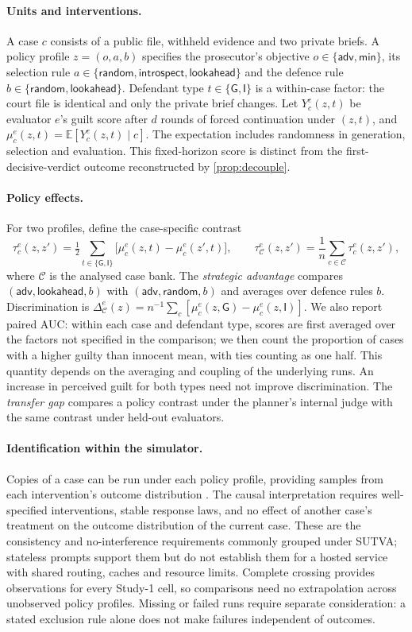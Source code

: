 \documentclass[10pt,a4paper]{article}
\theoremstyle{remark}
\newcommand{\E}{\mathbb{E}}
\newcommand{\G}{\mathsf{G}}
\newcommand{\I}{\mathsf{I}}
\newcommand{\adv}{\textsf{adv}}
\newcommand{\mini}{\textsf{min}}
\newcommand{\rnd}{\textsf{random}}
\newcommand{\intro}{\textsf{introspect}}
\newcommand{\look}{\textsf{lookahead}}
\begin{document}
\paragraph{Units and interventions.}
A case $c$ consists of a public file, withheld evidence and two private briefs. A policy profile
$z=(o,a,b)$ specifies the prosecutor's objective $o\in\{\adv,\mini\}$, its selection rule
$a\in\{\rnd,\intro,\look\}$ and the defence rule $b\in\{\rnd,\look\}$. Defendant type
$t\in\{\G,\I\}$ is a within-case factor: the court file is identical and only the private brief changes.
Let $Y^e_c(z,t)$ be evaluator $e$'s guilt score after $d$ rounds of forced continuation under $(z,t)$, and
$\mu^e_c(z,t)=\E[Y^e_c(z,t)\mid c]$. The expectation includes randomness in generation, selection and evaluation.
This fixed-horizon score is distinct from the first-decisive-verdict outcome reconstructed by
\cref{prop:decouple}.

\paragraph{Policy effects.}
For two profiles, define the case-specific contrast
\begin{equation}
\tau^e_c(z,z')=\tfrac12\sum_{t\in\{\G,\I\}}\bigl[\mu^e_c(z,t)-\mu^e_c(z',t)\bigr],
\qquad
\tau^e_{\mathcal C}(z,z')=\frac1n\sum_{c\in\mathcal C}\tau^e_c(z,z'),
\end{equation}
where $\mathcal C$ is the analysed case bank. The \emph{strategic advantage} compares
$(\adv,\look,b)$ with $(\adv,\rnd,b)$ and averages over defence rules $b$. Discrimination is
$\Delta^e_{\mathcal C}(z)=n^{-1}\sum_c[\mu^e_c(z,\G)-\mu^e_c(z,\I)]$.
We also report paired AUC: within each case and defendant type, scores are first averaged over the factors not
specified in the comparison; we then count the proportion of cases with a higher guilty than innocent mean,
with ties counting as one half. This quantity depends on the averaging and coupling of the underlying runs.
An increase in perceived guilt for both types need not improve discrimination. The \emph{transfer gap} compares a
policy contrast under the planner's internal judge with the same contrast under held-out evaluators.

\paragraph{Identification within the simulator.}
Copies of a case can be run under each policy profile, providing samples from each intervention's outcome
distribution \citep{holland1986,imbens2015}. The causal interpretation requires well-specified interventions,
stable response laws, and no effect of another case's treatment on the outcome distribution of the current case.
These are the consistency and no-interference requirements commonly grouped under SUTVA; stateless prompts support
them but do not establish them for a hosted service with shared routing, caches and resource limits. Complete
crossing provides observations for every Study-1 cell, so comparisons need no extrapolation across unobserved
policy profiles. Missing or failed runs require separate consideration: a stated exclusion rule alone does not
make failures independent of outcomes.
\end{document}
